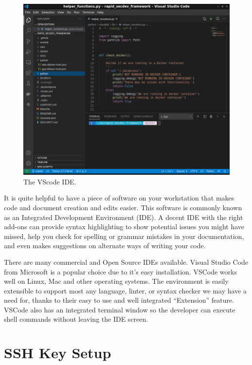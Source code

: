 \begin{figure}[!htb]
\centering
\includegraphics[scale=0.45]{images/setup-vscode.png}
\caption{The VScode IDE.}
\label{vscode-ide}
\end{figure}

\justifying
It is quite helpful to have a piece of software on your workstation that makes code and document creation and edits easier. This
software is commonly known as an Integrated Development Environment (IDE). A decent IDE with the right add-ons can
provide syntax highlighting to show potential issues you might have missed, help you check for spelling or
grammar mistakes in your documentation, and even makes suggestions on alternate ways of writing your code.

\justifying
There are many commercial and Open Source IDEs available. Visual Studio Code from Microsoft is a popular choice due to it's easy
installation. VSCode works well on Linux, Mac and other operating systems.
The environment is easily extensible to support most any language, linter, or syntax checker we may have a need
for, thanks to their easy to use and well integrated ``Extension'' feature. VSCode also has an integrated terminal
window so the developer can execute shell commands without leaving the IDE screen.

\section{SSH Key Setup}

